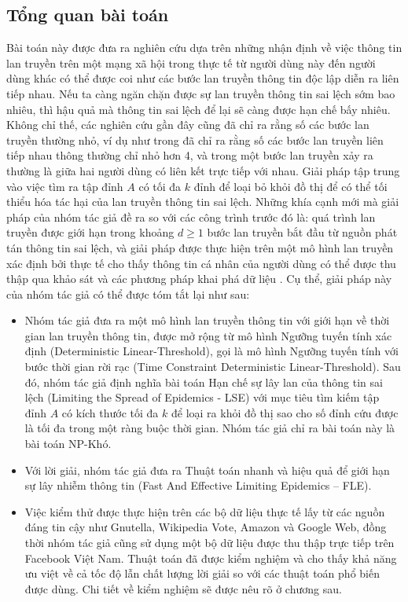 \subsection{Tổng quan bài toán}
Bài toán này được đưa ra nghiên cứu dựa trên những nhận định về việc thông tin lan truyền trên một mạng xã hội trong thực tế từ người dùng này đến người dùng khác có thể được coi như các bước lan truyền thông tin độc lập diễn ra liên tiếp nhau. Nếu ta càng ngăn chặn được sự lan truyền thông tin sai lệch sớm bao nhiêu, thì hậu quả mà thông tin sai lệch để lại sẽ càng được hạn chế bấy nhiêu. Không chỉ thế, các nghiên cứu gần đây cũng đã chỉ ra rằng số các bước lan truyền thường nhỏ, ví dụ như trong \cite{cha23} đã chỉ ra rằng số các bước lan truyền liên tiếp nhau thông thường chỉ nhỏ hơn 4, và trong \cite{lesk16} một bước lan truyền xảy ra thường là giữa hai người dùng có liên kết trực tiếp với nhau.
Giải pháp tập trung vào việc tìm ra tập đỉnh $A$ có tối đa $k$ đỉnh để loại bỏ khỏi đồ thị để có thể tối thiểu hóa tác hại của lan truyền thông tin sai lệch. Những khía cạnh mới mà giải pháp của nhóm tác giả đề ra so với các công trình trước đó là: quá trình lan truyền được giới hạn trong khoảng $d \geq 1$ bước lan truyền bắt đầu từ nguồn phát tán thông tin sai lệch, và giải pháp được thực hiện trên một mô hình lan truyền xác định bởi thực tế cho thấy thông tin cá nhân của người dùng có thể được thu thập qua khảo sát và các phương pháp khai phá dữ liệu \cite{zaixin}. Cụ thể, giải pháp này của nhóm tác giả có thể được tóm tắt lại như sau:
\begin{itemize}
	\item Nhóm tác giả đưa ra một mô hình lan truyền thông tin với giới hạn về thời gian lan truyền thông tin, được mở rộng từ mô hình Ngưỡng tuyến tính xác định (Deterministic Linear-Threshold), gọi là mô hình Ngưỡng tuyến tính với bước thời gian rời rạc (Time Constraint Deterministic Linear-Threshold). Sau đó, nhóm tác giả định nghĩa bài toán Hạn chế sự lây lan của thông tin sai lệch (Limiting the Spread of Epidemics - LSE) với mục tiêu tìm kiếm tập đỉnh $A$ có kích thước tối đa $k$ để loại ra khỏi đồ thị sao cho số đỉnh cứu được là tối đa trong một ràng buộc thời gian. Nhóm tác giả chỉ ra bài toán này là bài toán NP-Khó.
	\item Với lời giải, nhóm tác giả đưa ra Thuật toán nhanh và hiệu quả để giới hạn sự lây nhiễm thông tin (Fast And Effective Limiting Epidemics – FLE).
	\item Việc kiểm thử được thực hiện trên các bộ dữ liệu thực tế lấy từ các nguồn đáng tin cậy như Gnutella, Wikipedia Vote, Amazon và Google Web, đồng thời nhóm tác giả cũng sử dụng một bộ dữ liệu được thu thập trực tiếp trên Facebook Việt Nam. Thuật toán đã được kiểm nghiệm và cho thấy khả năng ưu việt về cả tốc độ lẫn chất lượng lời giải so với các thuật toán phổ biến được dùng. Chi tiết về kiểm nghiệm sẽ được nêu rõ ở chương sau.
\end{itemize}  

